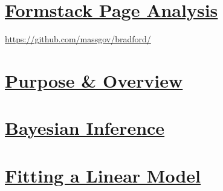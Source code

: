 \documentclass{article}
\begin{document}
\section*{\underline{Formstack Page Analysis}}
\url{https://github.com/massgov/bradford/}

\section*{\underline{Purpose \& Overview}}



\section*{\underline{Bayesian Inference}}




\section*{\underline{Fitting a Linear Model}}
\end{document}
